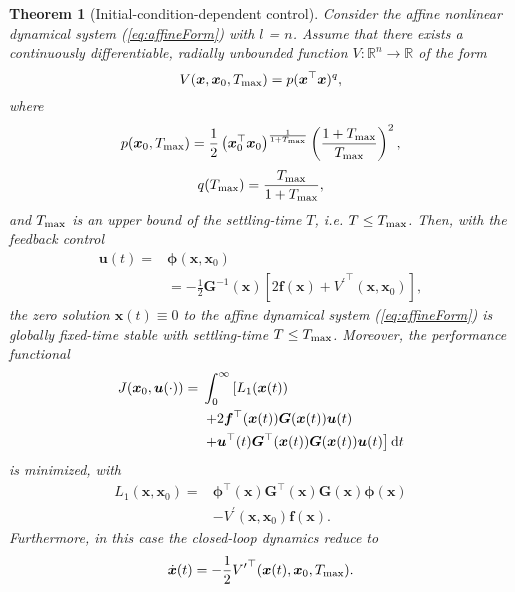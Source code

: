 \documentclass[lettersize,journal]{IEEEtran}
\newtheorem{theorem}{Theorem}
\begin{document}
\begin{theorem}[Initial-condition-dependent control]\label{th:inCoDepCon}
Consider the affine nonlinear dynamical system (\ref{eq:affineForm}) with $l$ = $n$. Assume that there exists a continuously differentiable, radially unbounded function $V : \mathbb{R}^{n} \rightarrow \mathbb{R}$ of the form
\begin{equation}\label{eq:VofxChoice}
V(\bm{x}, \bm{x}_0, T_{\textup{max}}) = p(\bm{x}^\top\bm{x})^q,
\end{equation}
where
\begin{equation}\label{eq:pofTmax}
p(\bm{x}_0, T_{\textup{max}}) = \frac{1}{2}\left(\bm{x}^\top_0\bm{x}_0\right)^{\frac{1}{1+T_{\textup{max}}}} \left(\frac{1+T_{\textup{max}}}{T_{\textup{max}}}\right)^2,
\end{equation}
\begin{equation}\label{eq:qofTmax}
q(T_{\textup{max}}) = \frac{T_{\textup{max}}}{1 + T_{\textup{max}}},
\end{equation} 
and $T_{\textup{max}}$ is an upper bound of the settling-time $T$, i.e. $T \leq T_{\textup{max}}$. 
Then, with the feedback control 
\begin{equation}\label{eq:uNew}
\begin{aligned}
\bm{u}(t) = {} & \bm{\phi}(\bm{x}, \bm{x}_0) \\
& = -\frac{1}{2}\bm{G}^{-1}(\bm{x})\left[2\bm{f}(\bm{x}) + {V^\prime}^\top(\bm{x}, \bm{x}_0)\right],
\end{aligned}
\end{equation}
the zero solution $\bm{x}(t) \equiv 0$ to the affine dynamical system (\ref{eq:affineForm}) is globally fixed-time stable with settling-time $T \leq T_{\textup{max}}$. 
Moreover, the performance functional 
\begin{equation}
\begin{aligned}
J(\bm{x}_0, \bm{u}(\cdot)) = {} & \int_0^\infty \left[L_1(\bm{x}(t)) \right. \\
& \left. + 2\bm{f}^\top(\bm{x}(t))\bm{G}(\bm{x}(t))\bm{u}(t) \right. \\ 
& \left. + \bm{u}^\top(t)\bm{G}^\top(\bm{x}(t))\bm{G}(\bm{x}(t))\bm{u}(t)\right] \textup{d}t \label{eq:Jnew}
\end{aligned}
\end{equation}
is minimized, with
\begin{equation}\label{eq:L1new}
\begin{aligned}
L_1(\bm{x}, \bm{x}_0) = {} & \bm{\phi}^\top(\bm{x})\bm{G}^\top(\bm{x})\bm{G}(\bm{x})\bm{\phi}(\bm{x}) \\ 
& - V^\prime(\bm{x}, \bm{x}_0)\bm{f}(\bm{x}).
\end{aligned}
\end{equation}
Furthermore, in this case the closed-loop dynamics reduce to
\begin{equation}\label{eq:closedLoop}
\dot{\bm{x}}(t) = -\frac{1}{2}{V^\prime}^\top(\bm{x}(t), \bm{x}_0, T_{\textup{max}}).
\end{equation}
\end{theorem}      
\end{document}
